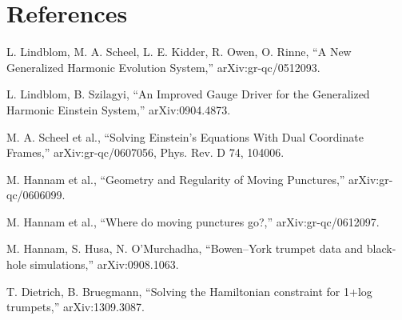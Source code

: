 \documentclass[11pt]{article}
\begin{document}
\section*{References}
\begin{enumerate}[label={[rabic*]}]
\item L. Lindblom, M. A. Scheel, L. E. Kidder, R. Owen, O. Rinne, ``A New Generalized Harmonic Evolution System,'' arXiv:gr-qc/0512093.
\item L. Lindblom, B. Szilagyi, ``An Improved Gauge Driver for the Generalized Harmonic Einstein System,'' arXiv:0904.4873.
\item M. A. Scheel et al., ``Solving Einstein's Equations With Dual Coordinate Frames,'' arXiv:gr-qc/0607056, Phys. Rev. D 74, 104006.
\item M. Hannam et al., ``Geometry and Regularity of Moving Punctures,'' arXiv:gr-qc/0606099.
\item M. Hannam et al., ``Where do moving punctures go?,'' arXiv:gr-qc/0612097.
\item M. Hannam, S. Husa, N. O'Murchadha, ``Bowen--York trumpet data and black-hole simulations,'' arXiv:0908.1063.
\item T. Dietrich, B. Bruegmann, ``Solving the Hamiltonian constraint for 1+log trumpets,'' arXiv:1309.3087.
\end{enumerate}
\end{document}
